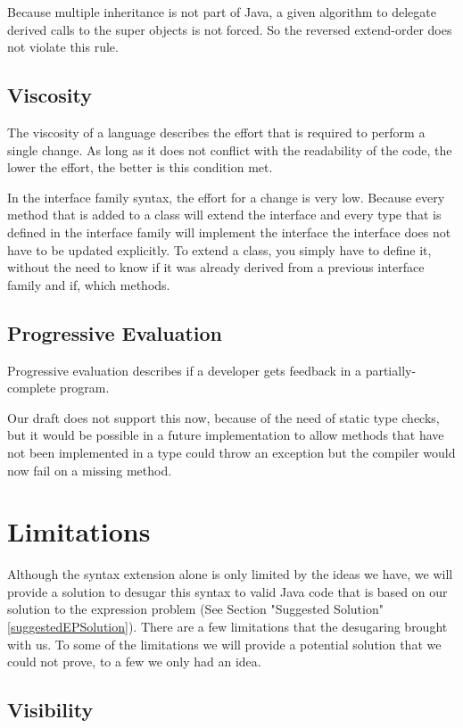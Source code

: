 \documentclass{report}
\begin{document}
Because multiple inheritance is not part of Java, a given algorithm to delegate derived calls to the super objects is not forced. So the reversed extend-order does not violate this rule.

\subsection{Viscosity}

The viscosity of a language describes the effort that is required to perform a single change. As long as it does not conflict with the readability of the code, the lower the effort, the better is this condition met.

In the interface family syntax, the effort for a change is very low. Because every method that is added to a class will extend the interface and every type that is defined in the interface family will implement the interface the interface does not have to be updated explicitly. To extend a class, you simply have to define it, without the need to know if it was already derived from a previous interface family and if, which methods.

\subsection{Progressive Evaluation}

Progressive evaluation describes if a developer gets feedback in a partially-complete program.

Our draft does not support this now, because of the need of static type checks, but it would be possible in a future implementation to allow methods that have not been implemented in a type could throw an exception but the compiler would now fail on a missing method.

\section{Limitations}

Although the syntax extension alone is only limited by the ideas we have, we will provide a solution to desugar this syntax to valid Java code that is based on our solution to the expression problem (See Section "Suggested Solution" \ref{suggestedEPSolution}). There are a few limitations that the desugaring brought with us. To some of the limitations we will provide a potential solution that we could not prove, to a few we only had an idea.

\subsection{Visibility}
\end{document}
